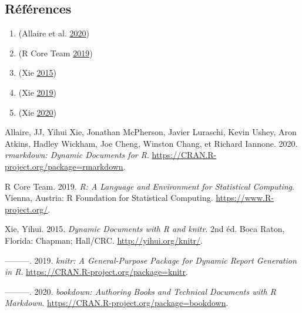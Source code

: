 \documentclass[
  french,
]{article}
\providecommand{\tightlist}{%
  \setlength{\itemsep}{0pt}\setlength{\parskip}{0pt}}
\begin{document}
\hypertarget{ruxe9fuxe9rences}{%
\subsection*{Références}\label{ruxe9fuxe9rences}}

\begin{enumerate}
\def\labelenumi{\arabic{enumi}.}
\tightlist
\item
  (Allaire et al. \protect\hyperlink{ref-R-rmarkdown}{2020})
\item
  (R Core Team \protect\hyperlink{ref-R-base}{2019})
\item
  (Xie \protect\hyperlink{ref-xie2015}{2015})
\item
  (Xie \protect\hyperlink{ref-R-knitr}{2019})
\item
  (Xie \protect\hyperlink{ref-R-bookdown}{2020})
\end{enumerate}

\hypertarget{refs}{}
\leavevmode\hypertarget{ref-R-rmarkdown}{}%
Allaire, JJ, Yihui Xie, Jonathan McPherson, Javier Luraschi, Kevin Ushey, Aron Atkins, Hadley Wickham, Joe Cheng, Winston Chang, et Richard Iannone. 2020. \emph{rmarkdown: Dynamic Documents for R}. \url{https://CRAN.R-project.org/package=rmarkdown}.

\leavevmode\hypertarget{ref-R-base}{}%
R Core Team. 2019. \emph{R: A Language and Environment for Statistical Computing}. Vienna, Austria: R Foundation for Statistical Computing. \url{https://www.R-project.org/}.

\leavevmode\hypertarget{ref-xie2015}{}%
Xie, Yihui. 2015. \emph{Dynamic Documents with R and knitr}. 2nd éd. Boca Raton, Florida: Chapman; Hall/CRC. \url{http://yihui.org/knitr/}.

\leavevmode\hypertarget{ref-R-knitr}{}%
---------. 2019. \emph{knitr: A General-Purpose Package for Dynamic Report Generation in R}. \url{https://CRAN.R-project.org/package=knitr}.

\leavevmode\hypertarget{ref-R-bookdown}{}%
---------. 2020. \emph{bookdown: Authoring Books and Technical Documents with R Markdown}. \url{https://CRAN.R-project.org/package=bookdown}.
\end{document}

